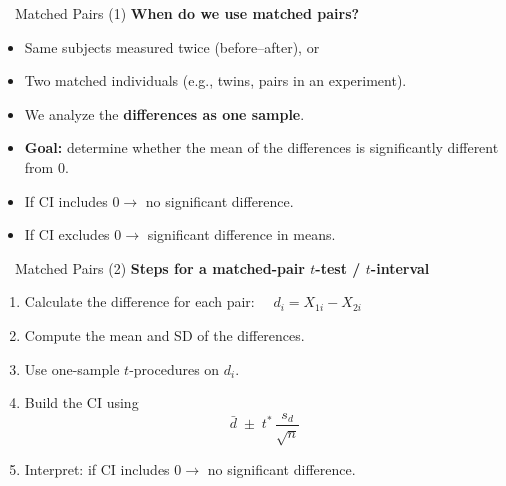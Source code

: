 \documentclass[aspectratio=169,11pt]{beamer}
\begin{document}
\begin{frame}{\ \ Matched Pairs (1)}
  \textbf{\color{qrnavy}When do we use matched pairs?}
  \begin{itemize}
    \item Same subjects measured twice (before--after), or
    \item Two matched individuals (e.g., twins, pairs in an experiment).
    \item We analyze the \textbf{differences as one sample}.
  \end{itemize}
  \vspace{0.4em}
  \begin{keybox}
    \begin{itemize}
      \item \textbf{Goal:} determine whether the mean of the differences is significantly different from $0$.
      \item If CI includes $0 \rightarrow$ no significant difference.
      \item If CI excludes $0 \rightarrow$ significant difference in means.
    \end{itemize}
  \end{keybox}
\end{frame}

\begin{frame}{\ \ Matched Pairs (2)}
  \textbf{\color{qrnavy}Steps for a matched-pair $t$-test / $t$-interval}
  \begin{enumerate}
    \item Calculate the difference for each pair: $\quad d_i = X_{1i} - X_{2i}$
    \item Compute the mean and SD of the differences.
    \item Use one-sample $t$-procedures on $d_i$.
    \item Build the CI using
      \begin{equation*}
        \bar{d} \;\pm\; t^* \,\frac{s_d}{\sqrt{n}}
      \end{equation*}
    \item Interpret: if CI includes $0 \rightarrow$ no significant difference.
  \end{enumerate}
\end{frame}
\end{document}
